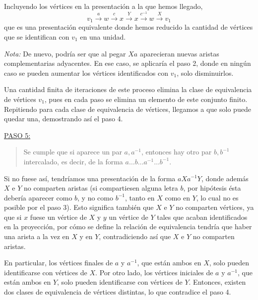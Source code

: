 {    \noindent
    Incluyendo los vértices en la presentación a la que hemos llegado, 
    \[
        v_1 \overset{a}{\to} w \overset{c}{\to} x \overset{Y}{\to} x \overset{c^{-1}}{\to} w \overset{X}{\to} v_1
    \]
    que es una presentación equivalente donde hemos reducido la cantidad de vértices que se identifican con $v_1$ en una unidad.

    \vspace{0.5em}
    \noindent
    \textit{Nota:} De nuevo, podría ser que al pegar $X a$ aparecieran nuevas aristas complementarias adyacentes. 
    En ese caso, se aplicaría el paso 2, donde en ningún caso se pueden aumentar los vértices identificados con $v_1$, solo disminuirlos.

    \vspace{0.5em}
    \noindent
    Una cantidad finita de iteraciones de este proceso elimina la clase de equivalencia de vértices $v_1$, 
    pues en cada paso se elimina un elemento de este conjunto finito. 
    Repitiendo para cada clase de equivalencia de vértices, llegamos a que solo puede quedar una, 
    demostrando así el paso 4.

    \vspace{1.3em}
    \noindent
    \underline{PASO 5:}
    \begin{quote}
        Se cumple que si aparece un par $a, a^{-1}$, entonces hay otro par $b, b^{-1}$ intercalado, 
        es decir, de la forma $a\dots b\dots a^{-1} \dots b^{-1}$.
    \end{quote}

    \noindent
    Si no fuese así, tendríamos una presentación de la forma $aXa^{-1}Y$, donde además $X$ e $Y$ no comparten aristas 
    (si compartiesen alguna letra $b$, por hipótesis ésta debería aparecer como $b$, y no como $b^{-1}$, tanto en $X$ como en $Y$, 
    lo cual no es posible por el paso 3). 
    Esto significa también que $X$ e $Y$ no comparten vértices, ya que si $x$ fuese un vértice de $X$ y $y$ un vértice de $Y$ tales que acaban identificados en la proyección,
    por cómo se define la relación de equivalencia tendría que haber una arista a la vez en $X$ y en $Y$, contradiciendo así que $X$ e $Y$ no comparten aristas.

    \vspace{0.5em}
    \noindent
    En particular, los vértices finales de $a$ y $a^{-1}$, que están ambos en $X$, 
    solo pueden identificarse con vértices de $X$. 
    Por otro lado, los vértices iniciales de $a$ y $a^{-1}$, que están ambos en $Y$, 
    solo pueden identificarse con vértices de $Y$. 
    Entonces, existen dos clases de equivalencia de vértices distintas, 
    lo que contradice el paso 4.

}
